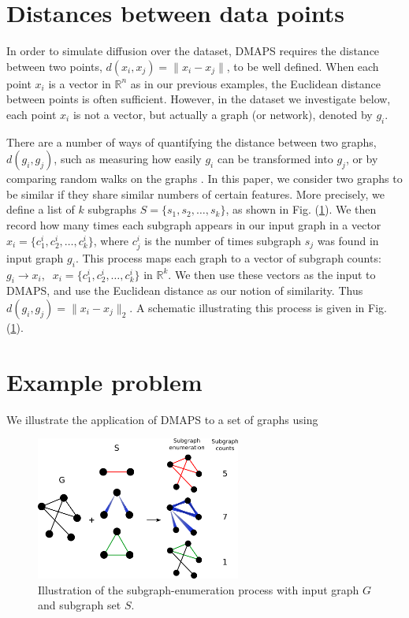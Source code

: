 \documentclass[11pt]{article}
\begin{document}
\section{Distances between data points}
In order to simulate diffusion over the dataset, DMAPS requires the distance between two points, $d(x_i, x_j) = \| x_i - x_j \|$, to be well defined. When each point $x_i$ is a vector in $\mathbb{R}^n$ as in our previous examples, the Euclidean distance between points is often sufficient. However, in the dataset we investigate below, each point $x_i$ is not a vector, but actually a graph (or network), denoted by $g_i$.

There are a number of ways of quantifying the distance between two graphs, $d(g_i, g_j)$, such as measuring how easily $g_i$ can be transformed into $g_j$, or by comparing random walks on the graphs \cite{edit_dist} \cite{graph_kernels}. In this paper, we consider two graphs to be similar if they share similar numbers of certain features. More precisely, we define a list of $k$ subgraphs $S=\{s_1, s_2, \ldots, s_k\}$, as shown in Fig. (\ref{fig:subgraph_counting}). We then record how many times each subgraph appears in our input graph in a vector $x_i = \{c_1^i, c_2^i, \ldots, c_k^i\}$, where $c_j^i$ is the number of times subgraph $s_j$ was found in input graph $g_i$. This process maps each graph to a vector of subgraph counts: $g_i \rightarrow x_i, \; \; x_i = \{c_1^i, c_2^i, \ldots, c_k^i\}$ in $\mathbb{R}^k$. We then use these vectors as the input to DMAPS, and use the Euclidean distance as our notion of similarity. Thus $d(g_i, g_j) = \| x_i - x_j \|_2$. A schematic illustrating this process is given in Fig. (\ref{fig:subgraph_counting}).

\section{Example problem}

We illustrate the application of DMAPS to a set of graphs using 

\begin{figure}[!h]
  \begin{center}
    \includegraphics[width=0.6\textwidth]{subgraph_counting}
    \caption{Illustration of the subgraph-enumeration process with input graph $G$ and subgraph set $S$.}
  \end{center}
  \label{fig:subgraph_counting}
\end{figure}
\end{document}
